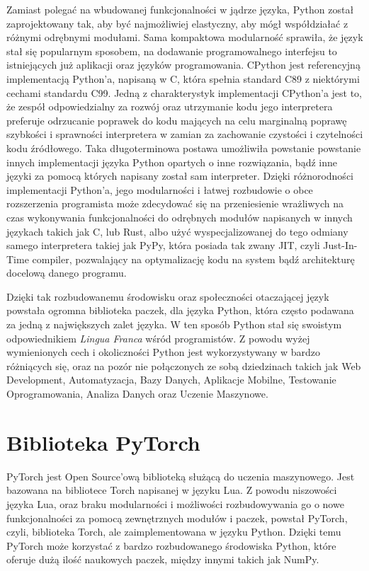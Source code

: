 Zamiast polegać na wbudowanej funkcjonalności w jądrze języka, Python został zaprojektowany tak, aby być najmożliwiej elastyczny, aby mógł współdziałać z różnymi odrębnymi modułami. Sama kompaktowa modularność sprawiła, że język stał się popularnym sposobem, na dodawanie programowalnego interfejsu to istniejących już aplikacji oraz języków programowania.
CPython jest referencyjną implementacją Python'a, napisaną w C, która spełnia standard C89 z niektórymi cechami standardu C99. Jedną z charakterystyk implementacji CPython'a jest to, że zespół odpowiedzialny za rozwój oraz utrzymanie kodu jego interpretera preferuje odrzucanie poprawek do kodu mających na celu marginalną poprawę szybkości i sprawności interpretera w zamian za zachowanie czystości i czytelności kodu źródłowego. Taka długoterminowa postawa umożliwiła powstanie powstanie innych implementacji języka Python opartych o inne rozwiązania, bądź inne języki za pomocą których napisany został sam interpreter. Dzięki różnorodności implementacji Python'a, jego modularności i łatwej rozbudowie o obce rozszerzenia programista może zdecydować się na przeniesienie wrażliwych na czas wykonywania funkcjonalności do odrębnych modułów napisanych w innych językach takich jak C, lub Rust, albo użyć wyspecjalizowanej do tego odmiany samego interpretera takiej jak PyPy, która posiada tak zwany JIT, czyli Just-In-Time compiler, pozwalający na optymalizację kodu na system bądź architekturę docelową danego programu.

Dzięki tak rozbudowanemu środowisku oraz społeczności otaczającej język powstała ogromna biblioteka paczek, dla języka Python, która często podawana za jedną z największych zalet języka. W ten sposób Python stał się swoistym odpowiednikiem \textit{Lingua Franca} wśród programistów. Z powodu wyżej wymienionych cech i okoliczności Python jest wykorzystywany w bardzo różniących się, oraz na pozór nie połączonych ze sobą dziedzinach takich jak Web Development, Automatyzacja, Bazy Danych, Aplikacje Mobilne, Testowanie Oprogramowania, Analiza Danych oraz Uczenie Maszynowe.



\section{Biblioteka PyTorch}

PyTorch \cite{PyTorchWebSite} \cite{DeepLearningWithPyTorch} \cite{ProgrammingPyTorchForDeepLearning} \cite{PyTorchPocketReference} jest Open Source'ową biblioteką służącą do uczenia maszynowego. Jest bazowana na bibliotece Torch napisanej w języku Lua. Z powodu niszowości języka Lua, oraz braku modularności i możliwości rozbudowywania go o nowe funkcjonalności za pomocą zewnętrznych modułów i paczek, powstał PyTorch, czyli, biblioteka Torch, ale zaimplementowana w języku Python. Dzięki temu PyTorch może korzystać z bardzo rozbudowanego środowiska Python, które oferuje dużą ilość naukowych paczek, między innymi takich jak NumPy.


